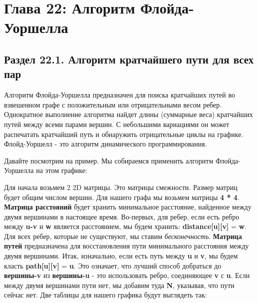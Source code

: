
\chapter*{Глава 22: Алгоритм Флойда- Уоршелла}
\section*{Раздел 22.1. Алгоритм кратчайшего пути для всех пар}

\vspace{\baselineskip}
Алгоритм Флойда-Уоршелла предназначен для поиска кратчайших путей во взвешенном графе с положительным или отрицательными весом ребер. Однократное выполнение алгоритма найдет длины (суммарные веса) кратчайших путей между всеми парами вершин. С небольшими вариациями он может распечатать кратчайший путь и обнаружить отрицательные циклы на графике. Флойд-Уоршелл - это алгоритм динамического программирования.

Давайте посмотрим на пример. Мы собираемся применить алгоритм Флойда-Уоршелла на этом графике:

\vspace{\baselineskip}
\vspace{\baselineskip}

\vspace{\baselineskip}
Для начала возьмем 2 2D матрицы. Это матрицы смежности. Размер матриц будет общим числом вершин. Для нашего графа мы возьмем матрицы \textbf{4 * 4}. \textbf{Матрица расстояний} будет хранить минимальное расстояние, найденное между двумя вершинами в настоящее время. Во-первых, для ребер, если есть ребро между \textbf{u-v} и \textbf{w} является расстоянием, мы будем хранить: \textbf{distance[u][v]} = \textbf{w}. Для всех ребер, которые не существуют, мы ставим \textit{бесконечность}. \textbf{Матрица путей} предназначена для восстановления пути минимального расстояния между двумя вершинами. Итак, изначально, если есть путь между \textbf{u} и \textbf{v}, мы будем класть \textbf{path[u][v]} = \textbf{u}. Это означает, что лучший способ добраться до \textbf{вершины-v} из \textbf{вершины-u} - это использовать ребро, соединяющее \textbf{v} с \textbf{u}. Если между двумя вершинами пути нет, мы добавим туда \textbf{N}, указывая, что пути сейчас нет. Две таблицы для нашего графика будут выглядеть так:


